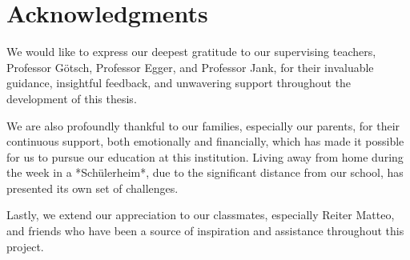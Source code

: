 \chapter*{Acknowledgments}

We would like to express our deepest gratitude to our supervising teachers, Professor Götsch, Professor Egger, and Professor Jank, for their invaluable guidance, insightful feedback, and unwavering support throughout the development of this thesis.

We are also profoundly thankful to our families, especially our parents, for their continuous support, both emotionally and financially, which has made it possible for us to pursue our education at this institution. Living away from home during the week in a *Schülerheim*, due to the significant distance from our school, has presented its own set of challenges.

Lastly, we extend our appreciation to our classmates, especially Reiter Matteo, and friends who have been a source of inspiration and assistance throughout this project.
